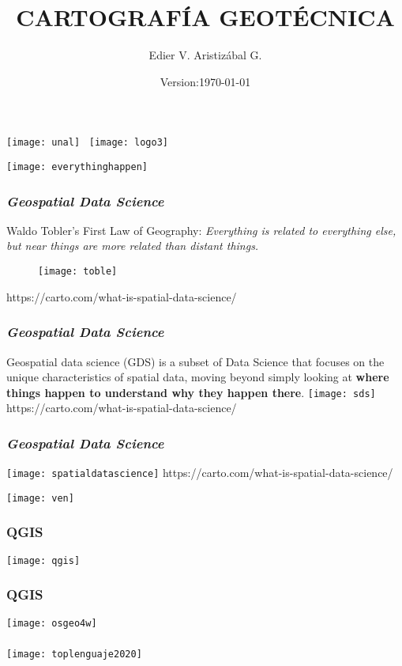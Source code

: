 \documentclass[12pt]{beamer}
\title[Ambiente de trabajo]{CARTOGRAFÍA GEOTÉCNICA}
\author[Edier Aristizábal]{Edier V. Aristizábal G.}
\institute{\emph{evaristizabalg@unal.edu.co}}
\date{Version:\today}
\begin{document}
\begin{frame}
\titlepage
\centering
	\texttt{[image: unal]}\hspace*{4.75cm}~%
   	\texttt{[image: logo3]} 
\end{frame}
 \begin{frame}
\centering
	\texttt{[image: everythinghappen]} 
\end{frame}
\begin{frame}
\frametitle{\emph{Geospatial Data Science}}
\scriptsize{Waldo Tobler’s First Law of Geography: \emph{Everything is related to everything else, but near things are more related than distant things.}}
\begin{figure}
\centering
	\texttt{[image: toble]}\vfill
\end{figure}
\tiny{https://carto.com/what-is-spatial-data-science/}
\end{frame}
\begin{frame}
\frametitle{\emph{Geospatial Data Science}}
\scriptsize{Geospatial data science (GDS) is a subset of Data Science that focuses on the unique characteristics of spatial data, moving beyond simply looking at \textbf{where things happen to understand why they happen there}}.\vfill
\centering
	\texttt{[image: sds]}\vfill
\tiny{https://carto.com/what-is-spatial-data-science/}
\end{frame}
\begin{frame}
\frametitle{\emph{Geospatial Data Science}}
\centering
	\texttt{[image: spatialdatascience]}\vfill
	\tiny{https://carto.com/what-is-spatial-data-science/}
\end{frame}
\begin{frame}
\centering
	\texttt{[image: ven]}
\end{frame}
 \begin{frame}
\frametitle{QGIS}
\centering
	\texttt{[image: qgis]} 
\end{frame}
 \begin{frame}
\frametitle{QGIS}
\centering
	\texttt{[image: osgeo4w]} 
\end{frame}
\begin{frame}
\frametitle{}
\centering
	\texttt{[image: toplenguaje2020]} 
\end{frame}
\end{document}
